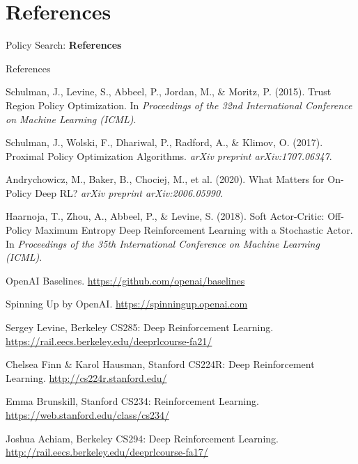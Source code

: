 \section{References}
\begin{frame}{}
    \LARGE Policy Search: \textbf{References}
\end{frame}

\begin{frame}[allowframebreaks]{References}
\begin{thebibliography}{99}

Schulman, J., Levine, S., Abbeel, P., Jordan, M., \& Moritz, P. (2015).
\newblock Trust Region Policy Optimization.
\newblock In \emph{Proceedings of the 32nd International Conference on Machine Learning (ICML)}.

Schulman, J., Wolski, F., Dhariwal, P., Radford, A., \& Klimov, O. (2017).
\newblock Proximal Policy Optimization Algorithms.
\newblock \emph{arXiv preprint arXiv:1707.06347}.

Andrychowicz, M., Baker, B., Chociej, M., et al. (2020).
\newblock What Matters for On-Policy Deep RL?
\newblock \emph{arXiv preprint arXiv:2006.05990}.

Haarnoja, T., Zhou, A., Abbeel, P., \& Levine, S. (2018).
\newblock Soft Actor-Critic: Off-Policy Maximum Entropy Deep Reinforcement Learning with a Stochastic Actor.
\newblock In \emph{Proceedings of the 35th International Conference on Machine Learning (ICML)}.

OpenAI Baselines.
\newblock \url{https://github.com/openai/baselines}

Spinning Up by OpenAI.
\newblock \url{https://spinningup.openai.com}

Sergey Levine, Berkeley CS285: Deep Reinforcement Learning.
\newblock \url{https://rail.eecs.berkeley.edu/deeprlcourse-fa21/}

Chelsea Finn \& Karol Hausman, Stanford CS224R: Deep Reinforcement Learning.
\newblock \url{http://cs224r.stanford.edu/}

Emma Brunskill, Stanford CS234: Reinforcement Learning.
\newblock \url{https://web.stanford.edu/class/cs234/}

Joshua Achiam, Berkeley CS294: Deep Reinforcement Learning.
\newblock \url{http://rail.eecs.berkeley.edu/deeprlcourse-fa17/}

\end{thebibliography}
\end{frame}